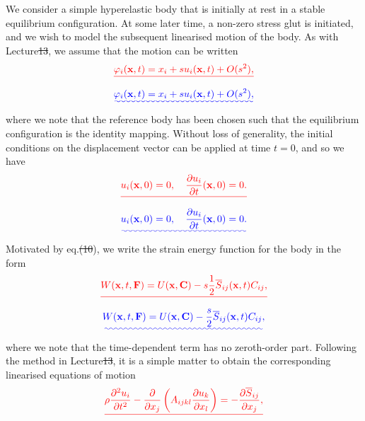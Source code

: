 \documentclass [a4paper,12pt]{paper}
\providecommand{\DIFadd}[1]{{\protect\color{blue}\uwave{#1}}} %
\providecommand{\DIFdel}[1]{{\protect\color{red}\sout{#1}}}                      %
\providecommand{\DIFaddbegin}{} %
\providecommand{\DIFaddend}{} %
\providecommand{\DIFdelbegin}{} %
\providecommand{\DIFdelend}{} %
\begin{document}
We consider a simple hyperelastic body that is initially at rest in a stable equilibrium configuration. At some 
later time, a non-zero stress glut is initiated, and we wish to model the subsequent linearised motion of the body. As 
with Lecture\DIFdelbegin \DIFdel{13}\DIFdelend \DIFaddbegin \DIFadd{~14}\DIFaddend , we assume that the motion can be written
\DIFdelbegin \begin{displaymath}
\DIFdel{\varphi_{i}(\mathbf{x}, t) = x_{i} + s u_{i}(\mathbf{x}, t) + O(s^2),
}\end{displaymath}%
\DIFdelend \DIFaddbegin \begin{equation}\DIFadd{\label{eq:13}
\varphi_{i}(\mathbf{x}, t) = x_{i} + s u_{i}(\mathbf{x}, t) + O(s^2),
}\end{equation}\DIFaddend 
where we note that the reference body has been chosen such that the equilibrium configuration is the identity mapping. 
Without loss of generality, the initial conditions on the displacement vector can be applied at time $t=0$, and so we have
\DIFdelbegin \begin{displaymath}
\DIFdel{u_{i}(\mathbf{x}, 0) = 0, \quad \frac{\partial u_{i}}{\partial t}(\mathbf{x}, 0) = 0.
}\end{displaymath}%
\DIFdelend \DIFaddbegin \begin{equation}\DIFadd{\label{eq:14}
u_{i}(\mathbf{x}, 0) = 0,\quad \frac{\partial u_{i}}{\partial t}(\mathbf{x}, 0) = 0.
}\end{equation}\DIFaddend 
Motivated by eq.\DIFdelbegin \DIFdel{(10}\DIFdelend \DIFaddbegin \DIFadd{~(\ref{eq:10}}\DIFaddend ), we write the strain energy function for the body in the form
\DIFdelbegin \begin{displaymath}
\DIFdel{W(\mathbf{x}, t, \mathbf{F}) = U(\mathbf{x}, \mathbf{C}) - s\frac{1}{2}\overline{S}_{ij}(\mathbf{x}, t)C_{ij},
}\end{displaymath}%
\DIFdelend \DIFaddbegin \begin{equation}\DIFadd{\label{eq:15}
W(\mathbf{x}, t, \mathbf{F}) = U(\mathbf{x}, \mathbf{C}) - \frac{s}{2}\overline{S}_{ij}(\mathbf{x}, t)C_{ij},
}\end{equation}\DIFaddend 
where we note that the time-dependent term has no zeroth-order part. Following the method in Lecture\DIFdelbegin \DIFdel{13}\DIFdelend \DIFaddbegin \DIFadd{~14}\DIFaddend , it is a simple 
matter to obtain the corresponding linearised equations of motion\DIFdelbegin \begin{displaymath}
\DIFdel{\rho\frac{\partial^2 u_{i}}{\partial t^2} - \frac{\partial}{\partial x_{j}}\left(A_{ijkl}\frac{\partial u_{k}}{\partial x_{l}}\right) = -\frac{\partial\overline{S}_{ij}}{\partial x_{j}},
}\end{displaymath}%
\end{document}
